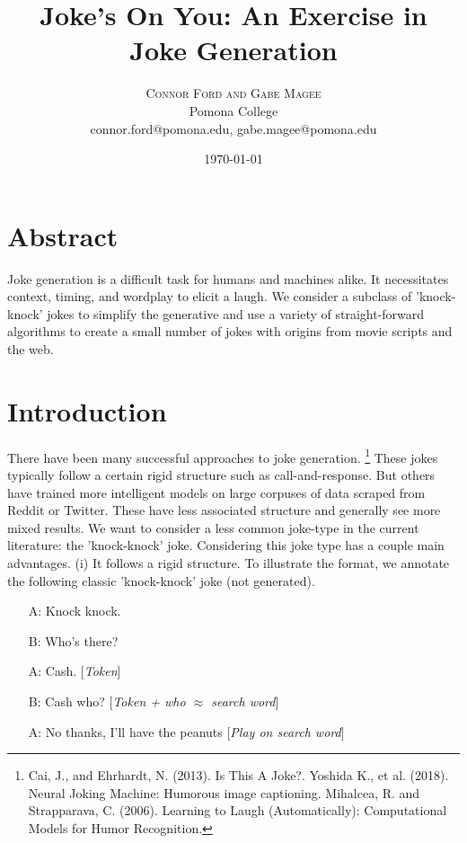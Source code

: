 \documentclass[twoside,twocolumn]{article}
\title{Joke's On You: An Exercise in Joke Generation}
\author{%
\textsc{Connor Ford and Gabe Magee} \\[1ex] 
\normalsize Pomona College \\ 
\normalsize connor.ford@pomona.edu, gabe.magee@pomona.edu
}
\date{\today}
\begin{document}
\maketitle

\section*{Abstract}

Joke generation is a difficult task for humans and machines alike. It necessitates context, timing, and wordplay to elicit a laugh. We consider a subclass of 'knock-knock' jokes to simplify the generative and use a variety of straight-forward algorithms to create a small number of jokes with origins from movie scripts and the web.

\section{Introduction}

There have been many successful approaches to joke generation. \footnote{Cai, J., and Ehrhardt, N. (2013). Is This A Joke?. Yoshida K., et al. (2018). Neural Joking Machine: Humorous image captioning. Mihalcea, R. and Strapparava, C. (2006). Learning to Laugh (Automatically): Computational Models for Humor Recognition.} 
These jokes typically follow a certain rigid structure such as call-and-response. But others have trained more intelligent models on large corpuses of data scraped from Reddit or Twitter. These have less associated structure and generally see more mixed results.
We want to consider a less common joke-type in the current literature: the 'knock-knock' joke. Considering this joke type has a couple main advantages.
(i) It follows a rigid structure. To illustrate the format, we annotate the following classic 'knock-knock' joke (not generated).
\begin{center}
\begin{enumerate}
\item[A:] Knock knock.
\item[B:] Who's there?
\item[A:] Cash. [\emph{Token}]
\item[B:] Cash who? [\emph{Token + who $\approx$ search word}]
\item[A:] No thanks, I'll have the peanuts [\emph{Play on search word}]
\end{enumerate}
\end{center}
\end{document}
